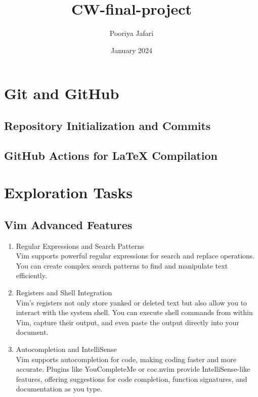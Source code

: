 \documentclass[titlepage]{article}
\title{CW-final-project}
\author{Pooriya Jafari}
\date{January 2024}
\begin{document}
\maketitle
\tableofcontents

\newpage

\section{Git and GitHub}
\subsection{Repository Initialization and Commits}

\subsection{GitHub Actions for LaTeX Compilation}

\newpage

\section{Exploration Tasks}
\subsection{Vim Advanced Features}
\begin{enumerate}
    \item Regular Expressions and Search Patterns\\
    Vim supports powerful regular expressions for search and replace operations. You can create complex search patterns to find and manipulate text efficiently.

    \item Registers and Shell Integration\\
    Vim's registers not only store yanked or deleted text but also allow you to interact with the system shell. You can execute shell commands from within Vim, capture their output, and even paste the output directly into your document.

    \item Autocompletion and IntelliSense\\
    Vim supports autocompletion for code, making coding faster and more accurate. Plugins like YouCompleteMe or coc.nvim provide IntelliSense-like features, offering suggestions for code completion, function signatures, and documentation as you type.
\end{enumerate}
\end{document}
